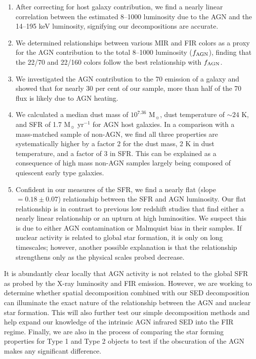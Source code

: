 \documentclass[fleqn, usenatbib]{mnras}
\newcommand{\msun}{M$_{\sun}$}
\begin{document}
\begin{enumerate}
\item After correcting for host galaxy contribution, we find a nearly linear correlation between the estimated 8--1000 \micron{} luminosity due to the AGN and the 14--195 keV luminosity, signifying our decompositions are accurate.

\item We determined relationships between various MIR and FIR colors as a proxy for the AGN contribution to the total 8--1000 \micron{} luminosity ($f_{\rm AGN}$), finding that the 22/70 and 22/160 colors follow the best relationship with $f_{\rm AGN}$. 

\item We investigated the AGN contribution to the 70 \micron{} emission of a galaxy and showed that for nearly 30 per cent of our sample, more than half of the 70 \micron{} flux is likely due to AGN heating.

\item We calculated a median dust mass of $10^{7.36}$ \msun{}, dust temperature of $\sim 24$ K, and SFR of 1.7 \msun{} yr$^{-1}$ for AGN host galaxies. In a comparison with a mass-matched sample of non-AGN, we find all three properties are systematically higher by a factor 2 for the dust mass, 2 K in dust temperature, and a factor of 3 in SFR. This can be explained as a consequence of high mass non-AGN samples largely being composed of quiescent early type galaxies.

\item Confident in our measures of the SFR, we find a nearly flat (slope $= 0.18\pm0.07$) relationship between the SFR and AGN luminosity. Our flat relationship is in contrast to previous low redshift studies that find either a nearly linear relationship or an upturn at high luminosities. We suspect this is due to either AGN contamination or Malmquist bias in their samples. If nuclear activity is related to global star formation, it is only on long timescales; however, another possible explanation is that the relationship strengthens only as the physical scales probed decrease.
\end{enumerate}

It is abundantly clear locally that AGN activity is not related to the global SFR as probed by the X-ray luminosity and FIR emission. However, we are working to determine whether spatial decomposition combined with our SED decomposition can illuminate the exact nature of the relationship between the AGN and nuclear star formation. This will also further test our simple decomposition methods and help expand our knowledge of the intrinsic AGN infrared SED into the FIR regime. Finally, we are also in the process of comparing the star forming properties for Type 1 and Type 2 objects to test if the obscuration of the AGN makes any significant difference.
\end{document}
